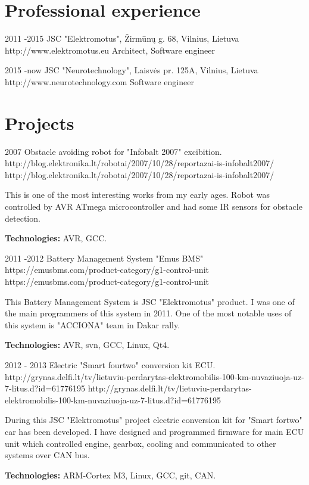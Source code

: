 \documentclass[12]{article}
\begin{document}

\section{Professional experience}

\job
{2011 -}{2015}
{JSC "Elektromotus", Žirmūnų g. 68, Vilnius, Lietuva}
{http://www.elektromotus.eu}
{Architect, Software engineer}
{
}

\job
{2015 -}{now}
{JSC "Neurotechnology", Laisvės pr. 125A, Vilnius, Lietuva}
{http://www.neurotechnology.com}
{Software engineer}
{
}

\section{Projects}

\job
{2007}{}
{Obstacle avoiding robot for "Infobalt 2007" excibition.}
{http://blog.elektronika.lt/robotai/2007/10/28/reportazai-is-infobalt2007/}
{http://blog.elektronika.lt/robotai/2007/10/28/reportazai-is-infobalt2007/}
{This is one of the most interesting works from my early ages.
Robot was controlled by AVR ATmega microcontroller and had some IR sensors for obstacle detection. \\
\rule{0mm}{5mm}\textbf{Technologies:} AVR, GCC.}


\job
{2011 -}{2012}
{Battery Management System "Emus BMS"}
{https://emusbms.com/product-category/g1-control-unit}
{https://emusbms.com/product-category/g1-control-unit}
{
This Battery Management System is JSC "Elektromotus" product.
I was one of the main programmers of this system in 2011.
One of the most notable uses of this system is "ACCIONA" team in Dakar rally.\\
\rule{0mm}{5mm}\textbf{Technologies:} AVR, svn, GCC, Linux, Qt4.}

\job
{2012 - }{2013}
{Electric "Smart fourtwo" conversion kit ECU.}
{http://grynas.delfi.lt/tv/lietuviu-perdarytas-elektromobilis-100-km-nuvaziuoja-uz-7-litus.d?id=61776195}
{http://grynas.delfi.lt/tv/lietuviu-perdarytas-elektromobilis-100-km-nuvaziuoja-uz-7-litus.d?id=61776195}
{
During this JSC "Elektromotus" project electric conversion kit for "Smart fortwo" car has been developed.
I have designed and programmed firmware for main ECU unit which controlled engine, gearbox, cooling and communicated to other systems over CAN bus.\\
\rule{0mm}{5mm}\textbf{Technologies:} ARM-Cortex M3, Linux, GCC, git, CAN.}
\end{document}
